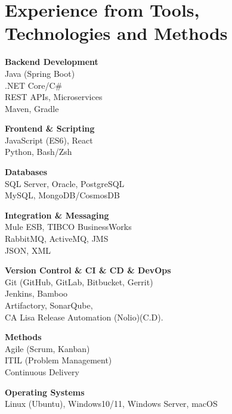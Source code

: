 \newcommand{\skillsection}[2]{
\vspace{10pt}
\noindent
\begin{minipage}[t]{0.48\textwidth}
\textbf{#1}\\[4pt]
\small #2
\end{minipage}
}\section{Experience from Tools, Technologies and Methods}

\vspace{6pt}

\skillsection{Backend Development}{
Java (Spring Boot)\\
.NET Core/C#\\
REST APIs, Microservices\\
Maven, Gradle
}
\hfill
\skillsection{Frontend \& Scripting}{
JavaScript (ES6), React\\
Python, Bash/Zsh
}

\skillsection{Databases}{
SQL Server, Oracle, PostgreSQL\\
MySQL, MongoDB/CosmosDB
}
\hfill
\skillsection{Integration \& Messaging}{
Mule ESB, TIBCO BusinessWorks\\
RabbitMQ, ActiveMQ, JMS\\
JSON, XML
}

\skillsection{Version Control \& CI \& CD \& DevOps}{
Git (GitHub, GitLab, Bitbucket, Gerrit)\\
Jenkins, Bamboo\\
Artifactory, SonarQube,  \\
{CA Lisa Release Automation (Nolio)(C.D).}
}
\hfill
\skillsection{Methods}{
Agile (Scrum, Kanban)\\
ITIL (Problem Management)\\
Continuous Delivery
}

\vspace{10pt}

\textbf{Operating Systems}\\[4pt]
\small Linux (Ubuntu), Windows10/11, Windows Server, macOS